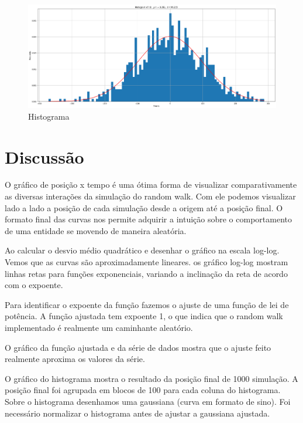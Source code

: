 \begin{figure}[!htb]
  \centering
  \caption{Histograma}
  \label{histograma}
  \includegraphics[width=1\textwidth]{figuras/output_4.png}
\end{figure}

\section{Discussão}
\label{sec_discussao_resultados}

O gráfico de posição x tempo é uma ótima forma de visualizar comparativamente as diversas interações da simulação do random walk. Com ele podemos visualizar lado a lado a posição de cada simulação desde a origem até a posição final. O formato final das curvas nos permite adquirir a intuição sobre o comportamento de uma entidade se movendo de maneira aleatória.

Ao calcular o desvio médio quadrático e desenhar o gráfico na escala log-log. Vemos que as curvas são aproximadamente lineares. os gráfico log-log mostram linhas retas para funções exponenciais, variando a inclinação da reta de acordo com o expoente. 

Para identificar o expoente da função fazemos o ajuste de uma função de lei de potência. A função ajustada tem expoente 1, o que indica que o random walk implementado é realmente um caminhante aleatório.

O gráfico da função ajustada e da série de dados mostra que o ajuste feito realmente aproxima os valores da série.

O gráfico do histograma mostra o resultado da posição final de 1000 simulação. A posição final foi agrupada em blocos de 100 para cada coluna do histograma. Sobre o histograma desenhamos uma gaussiana (curva em formato de sino). Foi necessário normalizar o histograma antes de ajustar a gaussiana ajustada.
